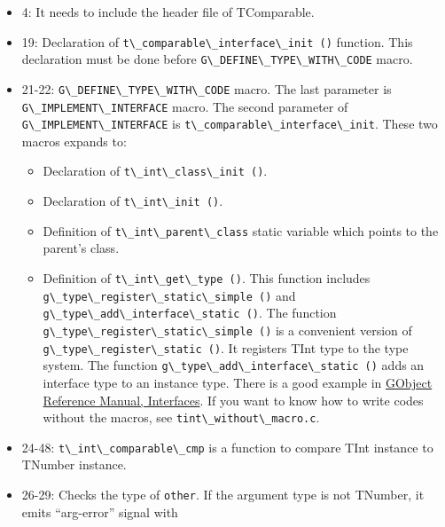\begin{itemize}
\tightlist
\item
  4: It needs to include the header file of TComparable.
\item
  19: Declaration of
  \passthrough{\lstinline!t\_comparable\_interface\_init ()!} function.
  This declaration must be done before
  \passthrough{\lstinline!G\_DEFINE\_TYPE\_WITH\_CODE!} macro.
\item
  21-22: \passthrough{\lstinline!G\_DEFINE\_TYPE\_WITH\_CODE!} macro.
  The last parameter is
  \passthrough{\lstinline!G\_IMPLEMENT\_INTERFACE!} macro. The second
  parameter of \passthrough{\lstinline!G\_IMPLEMENT\_INTERFACE!} is
  \passthrough{\lstinline!t\_comparable\_interface\_init!}. These two
  macros expands to:

  \begin{itemize}
  \tightlist
  \item
    Declaration of \passthrough{\lstinline!t\_int\_class\_init ()!}.
  \item
    Declaration of \passthrough{\lstinline!t\_int\_init ()!}.
  \item
    Definition of \passthrough{\lstinline!t\_int\_parent\_class!} static
    variable which points to the parent's class.
  \item
    Definition of \passthrough{\lstinline!t\_int\_get\_type ()!}. This
    function includes
    \passthrough{\lstinline!g\_type\_register\_static\_simple ()!} and
    \passthrough{\lstinline!g\_type\_add\_interface\_static ()!}. The
    function
    \passthrough{\lstinline!g\_type\_register\_static\_simple ()!} is a
    convenient version of
    \passthrough{\lstinline!g\_type\_register\_static ()!}. It registers
    TInt type to the type system. The function
    \passthrough{\lstinline!g\_type\_add\_interface\_static ()!} adds an
    interface type to an instance type. There is a good example in
    \href{https://docs.gtk.org/gobject/concepts.html\#non-instantiatable-classed-types-interfaces}{GObject
    Reference Manual, Interfaces}. If you want to know how to write
    codes without the macros, see
    \passthrough{\lstinline!tint\_without\_macro.c!}.
  \end{itemize}
\item
  24-48: \passthrough{\lstinline!t\_int\_comparable\_cmp!} is a function
  to compare TInt instance to TNumber instance.
\item
  26-29: Checks the type of \passthrough{\lstinline!other!}. If the
  argument type is not TNumber, it emits ``arg-error'' signal with

\end{itemize}

